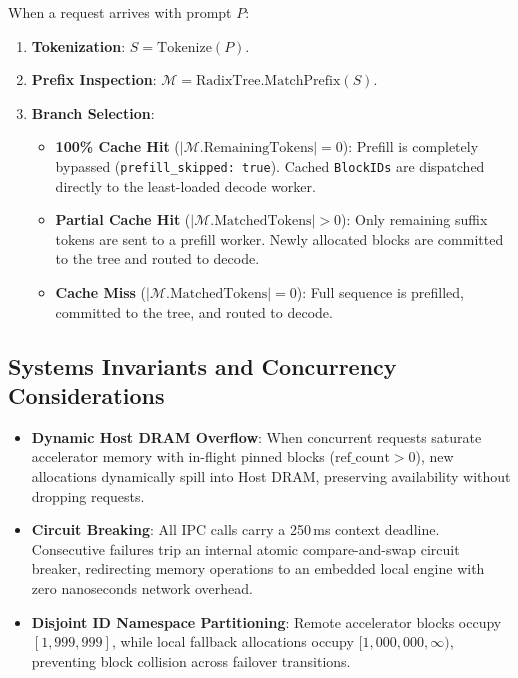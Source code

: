 \documentclass[10pt,twocolumn,letterpaper]{article}
\begin{document}
When a request arrives with prompt $P$:
\begin{enumerate}
    \item \textbf{Tokenization}: $S = \text{Tokenize}(P)$.
    \item \textbf{Prefix Inspection}: $\mathcal{M} = \text{RadixTree.MatchPrefix}(S)$.
    \item \textbf{Branch Selection}:
    \begin{itemize}
        \item \textbf{100\% Cache Hit} ($|\mathcal{M}.\text{RemainingTokens}| = 0$): Prefill is completely bypassed (\texttt{prefill\_skipped: true}). Cached \texttt{BlockIDs} are dispatched directly to the least-loaded decode worker.
        \item \textbf{Partial Cache Hit} ($|\mathcal{M}.\text{MatchedTokens}| > 0$): Only remaining suffix tokens are sent to a prefill worker. Newly allocated blocks are committed to the tree and routed to decode.
        \item \textbf{Cache Miss} ($|\mathcal{M}.\text{MatchedTokens}| = 0$): Full sequence is prefilled, committed to the tree, and routed to decode.
    \end{itemize}
\end{enumerate}

\subsection{Systems Invariants and Concurrency Considerations}
\begin{itemize}
    \item \textbf{Dynamic Host DRAM Overflow}: When concurrent requests saturate accelerator memory with in-flight pinned blocks ($\text{ref\_count} > 0$), new allocations dynamically spill into Host DRAM, preserving availability without dropping requests.
    \item \textbf{Circuit Breaking}: All IPC calls carry a 250\,ms context deadline. Consecutive failures trip an internal atomic compare-and-swap circuit breaker, redirecting memory operations to an embedded local engine with zero nanoseconds network overhead.
    \item \textbf{Disjoint ID Namespace Partitioning}: Remote accelerator blocks occupy $[1, 999{,}999]$, while local fallback allocations occupy $[1{,}000{,}000, \infty)$, preventing block collision across failover transitions.
\end{itemize}

\end{document}
